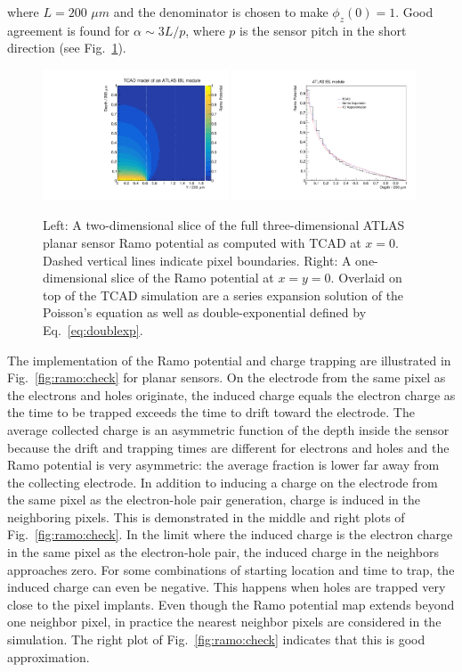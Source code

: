 where $L=200$ $\mu m$ and the denominator is chosen to make $\phi_z(0)=1$.  Good agreement is found for $\alpha\sim 3L/p$, where $p$ is the sensor pitch in the short direction (see Fig.~\ref{fig:ramo:planar}). 
\begin{figure}[!htpb]
\centering
\includegraphics[width=0.49\textwidth]{test_ramoxz_10.pdf}
\includegraphics[width=0.49\textwidth]{test_ramoz_10.pdf}
\caption{Left: A two-dimensional slice of the full three-dimensional ATLAS planar sensor Ramo potential as computed with TCAD at $x=0$.  Dashed vertical lines indicate pixel boundaries.  Right: A one-dimensional slice of the Ramo potential at $x=y=0$.  Overlaid on top of the TCAD simulation are a series expansion solution of the Poisson's equation as well as double-exponential defined by Eq.~\ref{eq:doublexp}.}
\label{fig:ramo:planar}
\end{figure}

The implementation of the Ramo potential and charge trapping are illustrated in Fig.~\ref{fig:ramo:check} for planar sensors.  On the electrode from the same pixel as the electrons and holes originate, the induced charge equals the electron charge as the time to be trapped exceeds the time to drift toward the electrode.   The average collected charge is an asymmetric function of the depth inside the sensor because the drift and trapping times are different for electrons and holes and the Ramo potential is very asymmetric: the average fraction is lower far away from the collecting electrode.  In addition to inducing a charge on the electrode from the same pixel as the electron-hole pair generation, charge is induced in the neighboring pixels.  This is demonstrated in the middle and right plots of Fig.~\ref{fig:ramo:check}.  In the limit where the induced charge is the electron charge in the same pixel as the electron-hole pair, the induced charge in the neighbors approaches zero.  For some combinations of starting location and time to trap, the induced charge can even be negative.  This happens when holes are trapped very close to the pixel implants.  Even though the Ramo potential map extends beyond one neighbor pixel, in practice the nearest neighbor pixels are considered in the simulation.  The right plot of Fig.~\ref{fig:ramo:check} indicates that this is good approximation.

